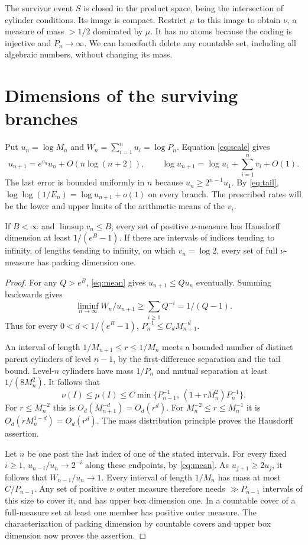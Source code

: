 \documentclass[11pt]{article}
\begin{document}
The survivor event $S$ is closed in the product space, being the intersection of cylinder conditions. Its image is compact. Restrict $\mu$ to this image to obtain $\nu$, a measure of mass $>1/2$ dominated by $\mu$. It has no atoms because the coding is injective and $P_n\to\infty$. We can henceforth delete any countable set, including all algebraic numbers, without changing its mass.

\section{Dimensions of the surviving branches}
Put $u_n=\log M_n$ and $W_n=\sum_{i=1}^n u_i=\log P_n$. Equation \eqref{eq:scale} gives
\begin{equation}\label{eq:mean}
 u_{n+1}=e^{v_n}u_n+O(n\log(n+2)),\qquad
 \log u_{n+1}=\log u_1+\sum_{i=1}^n v_i+O(1).
\end{equation}
The last error is bounded uniformly in $n$ because $u_n\ge2^{n-1}u_1$. By \eqref{eq:tail}, $\log\log(1/E_n)=\log u_{n+1}+o(1)$ on every branch. The prescribed rates will be the lower and upper limits of the arithmetic means of the $v_i$.

\begin{lemma}\label{lem:dimension}
If $B<\infty$ and $\limsup v_n\le B$, every set of positive $\nu$-measure has Hausdorff dimension at least $1/(e^B-1)$. If there are intervals of indices tending to infinity, of lengths tending to infinity, on which $v_n=\log2$, every set of full $\nu$-measure has packing dimension one.
\end{lemma}
\begin{proof}
For any $Q>e^B$, \eqref{eq:mean} gives $u_{n+1}\le Q u_n$ eventually. Summing backwards gives
\[
 \liminf_{n\to\infty} W_n/u_{n+1}\ge\sum_{i\ge1}Q^{-i}=1/(Q-1).
\]
Thus for every $0<d<1/(e^B-1)$, $P_n^{-1}\le C_d M_{n+1}^{-d}$.

An interval of length $1/M_{n+1}\le r\le1/M_n$ meets a bounded number of distinct parent cylinders of level $n-1$, by the first-difference separation and the tail bound. Level-$n$ cylinders have mass $1/P_n$ and mutual separation at least $1/(8M_n^2)$. It follows that
\[
 \nu(I)\le\mu(I)\le C\min\big\{P_{n-1}^{-1},\,(1+rM_n^2)P_n^{-1}\big\}.
\]
For $r\le M_n^{-2}$ this is $O_d(M_{n+1}^{-d})=O_d(r^d)$. For $M_n^{-2}\le r\le M_n^{-1}$ it is $O_d(rM_n^{1-d})=O_d(r^d)$. The mass distribution principle proves the Hausdorff assertion.

Let $n$ be one past the last index of one of the stated intervals. For every fixed $i\ge1$, $u_{n-i}/u_n\to2^{-i}$ along these endpoints, by \eqref{eq:mean}. As $u_{j+1}\ge2u_j$, it follows that $W_{n-1}/u_n\to1$. Every interval of length $1/M_n$ has mass at most $C/P_{n-1}$. Any set of positive $\nu$ outer measure therefore needs $\gg P_{n-1}$ intervals of this size to cover it, and has upper box dimension one. In a countable cover of a full-measure set at least one member has positive outer measure. The characterization of packing dimension by countable covers and upper box dimension now proves the assertion.
\end{proof}
\end{document}
